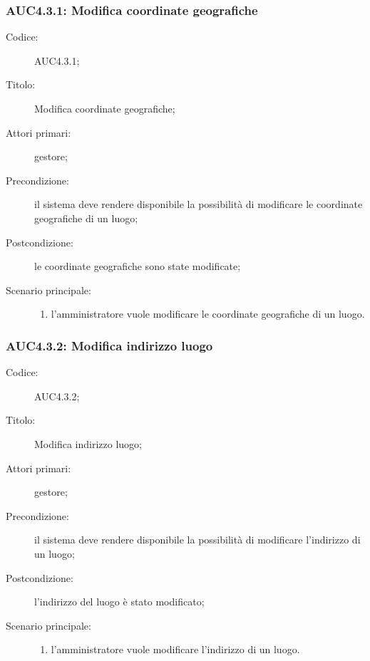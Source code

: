 \subsubsection{AUC4.3.1: Modifica coordinate geografiche}%
\label{subs:AUC4.3.1}
\begin{description}
  \item[Codice:] AUC4.3.1;
  \item[Titolo:] Modifica coordinate geografiche;
  \item[Attori primari:] gestore;
  \item[Precondizione:] il sistema deve rendere disponibile la possibilità di modificare le coordinate geografiche di un luogo;
  \item[Postcondizione:] le coordinate geografiche sono state modificate;
  \item[Scenario principale:]
  \begin{enumerate}
    \item l'amministratore vuole modificare le coordinate geografiche di un luogo.
  \end{enumerate}
\end{description}

\subsubsection{AUC4.3.2: Modifica indirizzo luogo}%
\label{subs:AUC4.3.2}
\begin{description}
  \item[Codice:] AUC4.3.2;
  \item[Titolo:] Modifica indirizzo luogo;
  \item[Attori primari:] gestore;
  \item[Precondizione:] il sistema deve rendere disponibile la possibilità di modificare l'indirizzo di un luogo;
  \item[Postcondizione:] l'indirizzo del luogo è stato modificato;
  \item[Scenario principale:]
  \begin{enumerate}
    \item l'amministratore vuole modificare l'indirizzo di un luogo.
  \end{enumerate}
\end{description}

